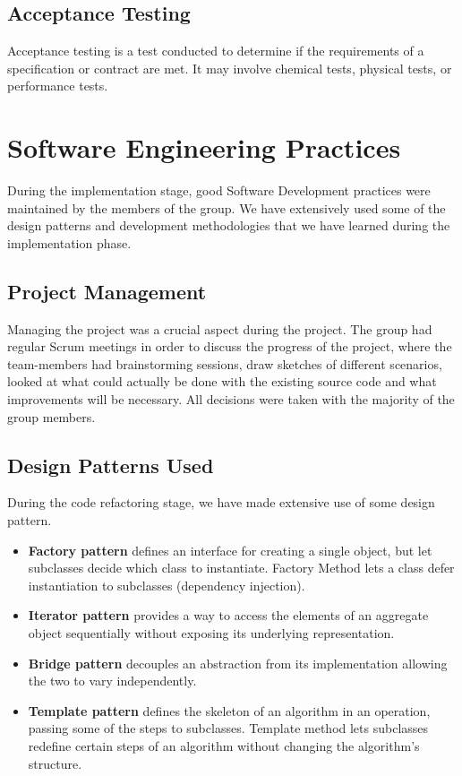 \documentclass[11pt,twocolumn]{article} %
\begin{document}
\subsection{Acceptance Testing}
Acceptance testing is a test conducted to determine if the requirements of a specification or contract are met. 
It may involve chemical tests, physical tests, or performance tests.

\section{Software Engineering Practices}
During the implementation stage, good Software Development practices were maintained by the members of the group. We have extensively used some of the design patterns and development methodologies that we have learned during the implementation phase.

\subsection{Project Management}
Managing the project was a crucial aspect during the project. The group had regular Scrum meetings in order to discuss the 
progress of the project, where the team-members had brainstorming sessions, draw sketches of different scenarios, looked at
what could actually be done with the existing source code and what improvements will be necessary. All decisions were taken
with the majority of the group members.

\subsection{Design Patterns Used}
During the code refactoring stage, we have made extensive use of some design pattern.
\begin{itemize}
\item{{\bf Factory pattern} defines an interface for creating a single object, but let subclasses decide which class to instantiate. Factory Method lets a class defer instantiation to subclasses (dependency injection).}
\item{{\bf Iterator pattern} provides a way to access the elements of an aggregate object sequentially without exposing its underlying representation.}
\item{{\bf Bridge pattern} decouples an abstraction from its implementation allowing the two to vary independently.}
\item{{\bf Template pattern} defines the skeleton of an algorithm in an operation, passing some of the steps to subclasses.
Template method lets subclasses redefine certain steps of an algorithm without changing the algorithm's structure.}
\end{itemize}
\end{document}
